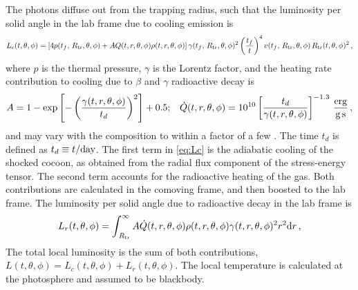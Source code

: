 \documentclass[twocolumn,dvipsnames]{aastex62}
\newcommand{\rtr}{\,{R_{\rm tr}}}
\begin{document}
The photons diffuse out from the trapping radius, such that the luminosity per solid angle in the lab frame due to cooling emission is
\begin{equation}\label{eq:Lc}
    L_c(t,\theta,\phi) = \left[4p(t_f,\rtr,\theta,\phi)+AQ(t,r,\theta,\phi)\rho(t,r,\theta,\phi)\right]\gamma(t_f,\rtr,\theta,\phi)^2\left(\frac{t_f}{t}\right)^4v(t_f,\rtr,\theta,\phi)\rtr(t,\theta,\phi)^2\,,
\end{equation}
where $ p $ is the thermal pressure, $ \gamma $ is the Lorentz factor, and the heating rate contribution to cooling due to $ \beta $ and $ \gamma $ radioactive decay is \citep{Hotokezaka2016b}
\begin{equation}\label{eq:Q}
    A = 1-{\rm exp}\left[-\left(\frac{\gamma(t,r,\theta,\phi)}{t_d}\right)^2\right]+0.5;\,\,\,\,\,
    \dot{Q}(t,r,\theta,\phi) = 10^{10}\left[\frac{t_d}{\gamma(t,r,\theta,\phi)}\right]^{-1.3}\,{\rm\frac{erg}{g\,s}}\,,
\end{equation}
and may vary with the composition to within a factor of a few \citep[see e.g.,][]{Freiburghaus1999,Metzger2010a,Korobkin2012,Wanajo2014,Hotokezaka2016b}. The time $ t_d $ is defined as $ t_d \equiv t/{\rm day} $.
The first term in \eqref{eq:Lc} is the adiabatic cooling of the shocked cocoon, as obtained from the radial flux component of the stress-energy tensor. The second term accounts for the radioactive heating of the gas. Both contributions are calculated in the comoving frame, and then boosted to the lab frame.
The luminosity per solid angle due to radioactive decay in the lab frame is
\begin{equation}\label{eq:Lr}
   L_r(t,\theta,\phi) = \int_{\rtr}^{\infty}A\dot{Q}(t,r,\theta,\phi){\rho(t,r,\theta,\phi)\gamma(t,r,\theta,\phi)^2r^2\mathrm{d}r}\,,
\end{equation}
The total local luminosity is the sum of both contributions, $ L(t,\theta,\phi) = L_c(t,\theta,\phi) +L_r(t,\theta,\phi) $.
The local temperature is calculated at the photosphere and assumed to be blackbody.
\end{document}
